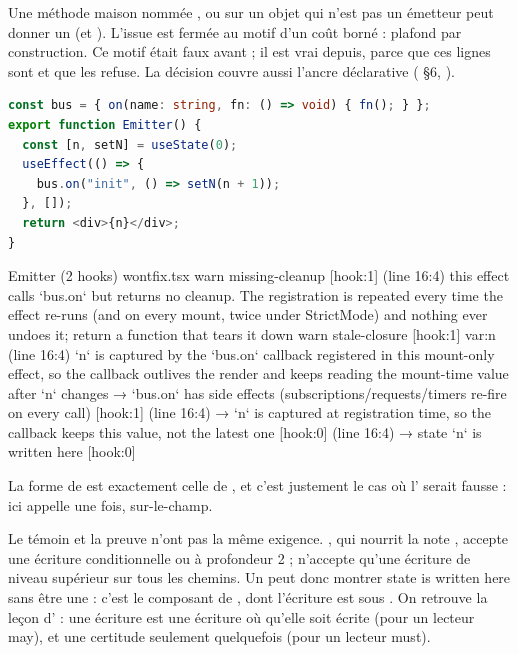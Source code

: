 \begin{decision}
Une méthode maison nommée ,  ou  sur un objet qui n'est pas un émetteur peut donner un \Warning{}  (et ). L'issue  est fermée  au motif d'un coût borné : plafond \Warning{} par construction. Ce motif était faux avant  ; il est vrai depuis, parce que ces lignes sont  et que  les refuse. La décision couvre aussi l'ancre déclarative  ( §6, ).
\begin{lstlisting}[language=TypeScript]
const bus = { on(name: string, fn: () => void) { fn(); } };
export function Emitter() {
  const [n, setN] = useState(0);
  useEffect(() => {
    bus.on("init", () => setN(n + 1));
  }, []);
  return <div>{n}</div>;
}
\end{lstlisting}
\begin{sortie}
  Emitter  (2 hooks)  wontfix.tsx
    warn   missing-cleanup  [hook:1]  (line 16:4)  this effect calls `bus.on` but returns no cleanup. The registration is repeated every time the effect re-runs (and on every mount, twice under StrictMode) and nothing ever undoes it; return a function that tears it down
    warn   stale-closure  [hook:1]  var:n  (line 16:4)  `n` is captured by the `bus.on` callback registered in this mount-only effect, so the callback outlives the render and keeps reading the mount-time value after `n` changes
       → `bus.on` has side effects (subscriptions/requests/timers re-fire on every call) [hook:1] (line 16:4)
       → `n` is captured at registration time, so the callback keeps this value, not the latest one [hook:0] (line 16:4)
       → state `n` is written here [hook:0]
\end{sortie}
La forme de  est exactement celle de , et c'est justement le cas où l'\Error{} serait fausse : ici  appelle  une fois, sur-le-champ.
\end{decision}

\begin{remarque}
Le témoin et la preuve n'ont pas la même exigence. , qui nourrit la note , accepte une écriture conditionnelle ou à profondeur 2 ;  n'accepte qu'une écriture de niveau supérieur sur tous les chemins. Un \Warning{} peut donc montrer \og state  is written here\fg{} sans être une \Error{} : c'est le composant  de , dont l'écriture est sous . On retrouve la leçon d' : une écriture est une écriture où qu'elle soit écrite (pour un lecteur may), et une certitude seulement quelquefois (pour un lecteur must).
\end{remarque}

